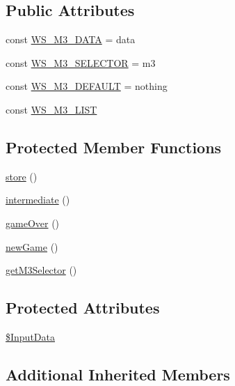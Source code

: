 \subsection*{Public Attributes}
\begin{DoxyCompactItemize}
\item 
const \hyperlink{class_w_s_match3_a78b631a8e2dcb333a4288e0257796217}{W\+S\+\_\+\+M3\+\_\+\+D\+A\+TA} = \textquotesingle{}data\textquotesingle{}
\item 
const \hyperlink{class_w_s_match3_af985e7b6d16f369725456e078acbb3e2}{W\+S\+\_\+\+M3\+\_\+\+S\+E\+L\+E\+C\+T\+OR} = \textquotesingle{}m3\textquotesingle{}
\item 
const \hyperlink{class_w_s_match3_ab480c232699bb4b14555537006172130}{W\+S\+\_\+\+M3\+\_\+\+D\+E\+F\+A\+U\+LT} = \textquotesingle{}nothing\textquotesingle{}
\item 
const \hyperlink{class_w_s_match3_a13949996d08030d1bf5f17ad19f77c28}{W\+S\+\_\+\+M3\+\_\+\+L\+I\+ST}
\end{DoxyCompactItemize}
\subsection*{Protected Member Functions}
\begin{DoxyCompactItemize}
\item 
\hyperlink{class_w_s_match3_a26d2ad6c89b5ec23676d9058351a85ad}{store} ()
\item 
\hyperlink{class_w_s_match3_afbcd987857d22156e83f94015f6be8ad}{intermediate} ()
\item 
\hyperlink{class_w_s_match3_a16d0c9ff94bf1349edc69fb58a8d0ff1}{game\+Over} ()
\item 
\hyperlink{class_w_s_match3_ac52182880ce359a41be077b9ad4142b3}{new\+Game} ()
\item 
\hyperlink{class_w_s_match3_aa38859d7b938a1a463f5f71fa9158f18}{get\+M3\+Selector} ()
\end{DoxyCompactItemize}
\subsection*{Protected Attributes}
\begin{DoxyCompactItemize}
\item 
\hyperlink{class_w_s_match3_a5d00b6220eaf523ce74cb85cee870f0a}{\$\+Input\+Data}
\end{DoxyCompactItemize}
\subsection*{Additional Inherited Members}


